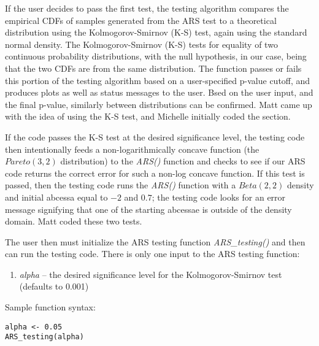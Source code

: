 \documentclass{article}
\begin{document}
If the user decides to pass the first test, the testing algorithm compares the empirical CDFs of samples generated from the ARS test to a theoretical distribution using the Kolmogorov-Smirnov (K-S) test, again using the standard normal density.  The Kolmogorov-Smirnov (K-S) tests for equality of two continuous probability distributions, with the null hypothesis, in our case, being that the two CDFs are from the same distribution. The function passes or fails this portion of the testing algorithm based on a user-specified p-value cutoff, and produces plots as well as status messages to the user.  Bsed on the user input, and the final p-value, similarly between distributions can be confirmed. Matt came up with the idea of using the K-S test, and Michelle initially coded the section.

If the code passes the K-S test at the desired significance level, the testing code then intentionally feeds a non-logarithmically concave function (the $Pareto\left(3,2\right)$ distribution) to the \textit{ARS()} function and checks to see if our ARS code returns the correct error for such a non-log concave function.  If this test is passed, then the testing code runs the \textit{ARS()} function with a $Beta\left(2,2\right)$ density and initial abcessa equal to $-2$ and $0.7$; the testing code looks for an error message signifying that one of the starting abcessae is outside of the density domain.  Matt coded these two tests.

The user then must initialize the ARS testing function \textit{ARS\_testing()} and then can run the testing code. There is only one input to the ARS testing function:
\begin{enumerate}
\item \textit{alpha} -- the desired significance level for the Kolmogorov-Smirnov test (defaults to 0.001)
\end{enumerate}
Sample function syntax:

\begin{lstlisting}
alpha <- 0.05
ARS_testing(alpha)
\end{lstlisting}
\end{document}

